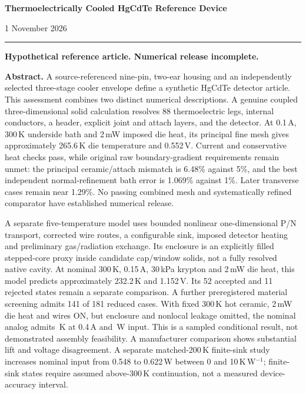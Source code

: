 \documentclass[11pt,a4paper]{article}
\begin{document}
\thispagestyle{empty}
{\Large\bfseries Thermoelectrically Cooled HgCdTe Reference Device\par}
\vspace{4mm}{\large Engineering Assessment\par}
\vspace{4mm}{\large\bfseries Revision 3\par}
1 November 2026
\vspace{3mm}\hrule\vspace{4mm}
\textcolor{failure}{\textbf{Hypothetical reference article. Numerical release incomplete.}}

\textbf{Abstract.} A source-referenced nine-pin, two-ear housing and an independently selected three-stage cooler envelope define a synthetic HgCdTe detector article. This assessment combines two distinct numerical descriptions. A genuine coupled three-dimensional solid calculation resolves 88 thermoelectric legs, internal conductors, a header, explicit joint and attach layers, and the detector. At 0.1\,A, 300\,K underside bath and 2\,mW imposed die heat, its principal fine mesh gives approximately 265.6\,K die temperature and 0.552\,V. Current and conservative heat checks pass, while original raw boundary-gradient requirements remain unmet: the principal ceramic/attach mismatch is 6.48\% against 5\%, and the best independent normal-refinement bath error is 1.069\% against 1\%. Later transverse cases remain near 1.29\%. No passing combined mesh and systematically refined comparator have established numerical release.

A separate five-temperature model uses bounded nonlinear one-dimensional P/N transport, corrected wire routes, a configurable sink, imposed detector heating and preliminary gas/radiation exchange. Its enclosure is an explicitly filled stepped-core proxy inside candidate cap/window solids, not a fully resolved native cavity. At nominal 300\,K, 0.15\,A, 30\,kPa krypton and 2\,mW die heat, this model predicts approximately 232.2\,K and 1.152\,V. Its 52 accepted and 11 rejected states remain a separate comparison. A further preregistered material screening admits 141 of 181 reduced cases. With fixed 300\,K hot ceramic, 2\,mW die heat and wires ON, but enclosure and nonlocal leakage omitted, the nominal analog admits \ScreenDie\,K at 0.4\,A and \ScreenPower\,W input. This is a sampled conditional result, not demonstrated assembly feasibility. A manufacturer comparison shows substantial lift and voltage disagreement. A separate matched-200\,K finite-sink study increases nominal input from 0.548 to 0.622\,W between 0 and 10\,K\,W$^{-1}$; finite-sink states require assumed above-300\,K continuation, not a measured device-accuracy interval.
\end{document}
